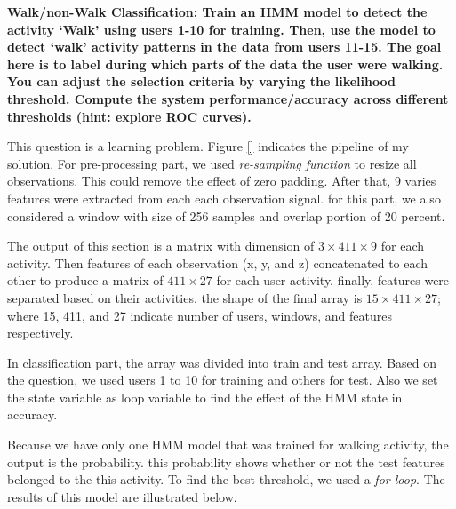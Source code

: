 \item \textbf{Walk/non-Walk Classification: Train an HMM model to detect the activity ‘Walk’ using users 1-10 for training. Then, use the model to detect ‘walk’ activity patterns in the data from users 11-15. The goal here is to label during which parts of the data the user were walking. You can adjust the selection criteria by varying the likelihood threshold. Compute the system performance/accuracy across different thresholds (hint: explore ROC curves).}

This question is a learning problem. Figure \ref{} indicates the pipeline of my solution. For pre-processing part, we used \emph{re-sampling function} to resize all observations. This could remove the effect of zero padding. After that, 9 varies features were extracted from each each observation signal. for this part, we also considered a window with size of 256 samples and overlap portion of 20 percent.

The output of this section is a matrix with dimension of $3 \times 411 \times 9$ for each activity. 
Then features of each observation (x, y, and z) concatenated to each other to produce a matrix of $411 \times 27$ for each user activity. finally, features were separated based on their activities. the shape of the final array is $15 \times 411 \times 27$; where 15, 411, and 27 indicate number of users, windows, and features respectively.  

In classification part, the array was divided into train and test array. Based on the question, we used users 1 to 10 for training and others for test. Also we set the state variable as loop variable to find the effect of the HMM state in accuracy.

Because we have only one HMM model that was trained for walking activity, the output is the probability. this probability shows whether or not the test features belonged to the this activity. To find the best threshold, we used a \emph{for loop}. The results of this model are illustrated below.  


